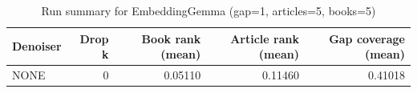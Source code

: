 \begin{table}
\caption{Run summary for EmbeddingGemma (gap=1, articles=5, books=5)}
\label{tab:summary_gap1_embeddinggemma_a5_b5}
\begin{tabular}{lrrrr}
\toprule
Denoiser & Drop k & Book rank (mean) & Article rank (mean) & Gap coverage (mean) \\
\midrule
NONE & 0 & 0.05110 & 0.11460 & 0.41018 \\
\bottomrule
\end{tabular}
\end{table}